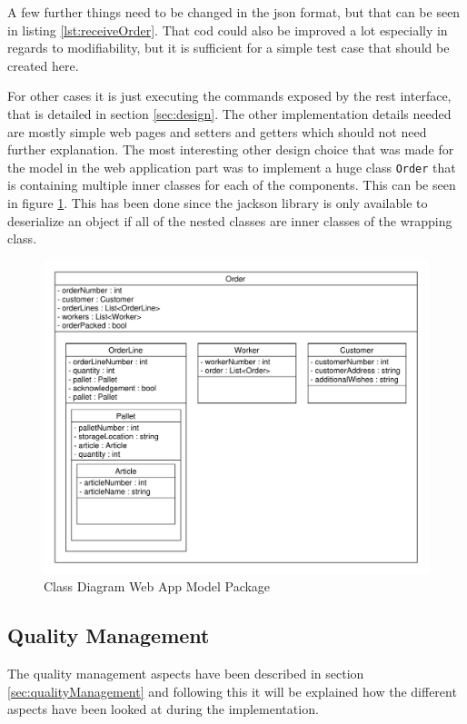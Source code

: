 A few further things need to be changed in the json format, but that can be seen in listing \ref{lst:receiveOrder}. That cod could also be improved a lot especially in regards to modifiability, but it is sufficient for a simple test case that should be created here.

For other cases it is just executing the commands exposed by the rest interface, that is detailed in section \ref{sec:design}. The other implementation details needed are mostly simple web pages and \gls{setter}s and \gls{getter}s which should not need further explanation. The most interesting other design choice that was made for the model in the web application part was to implement a huge class \texttt{Order} that is containing multiple inner classes for each of the components. This can be seen in figure \ref{fig:modelInnerClasses}. This has been done since the jackson library is only available to deserialize an object if all of the nested classes are inner classes of the wrapping class. 

\begin{figure}[htbp]
	\includegraphics[width=\linewidth]{images/WebAppModel}
	\caption{Class Diagram Web App Model Package}
	\label{fig:modelInnerClasses}
\end{figure}

\subsection{Quality Management}
The quality management aspects have been described in section \ref{sec:qualityManagement} and following this it will be explained how the different aspects have been looked at during the implementation.

